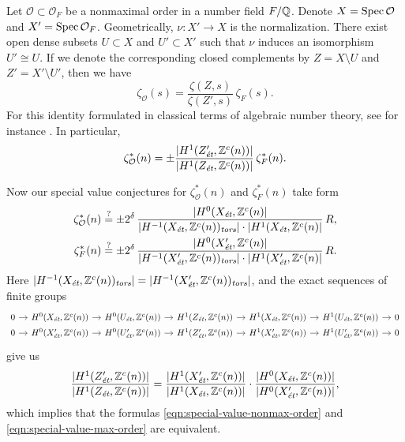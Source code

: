 \documentclass{article}
\numberwithin{equation}{section}
\begin{document}
\begin{example}
  Let $\mathcal{O} \subset \mathcal{O}_F$ be a nonmaximal order in a number
  field $F/\QQ$. Denote $X = \Spec \mathcal{O}$ and
  $X' = \Spec \mathcal{O}_F$. Geometrically, $\nu\colon X' \to X$ is the
  normalization. There exist open dense subsets $U \subset X$ and
  $U' \subset X'$ such that $\nu$ induces an isomorphism $U' \cong U$. If we
  denote the corresponding closed complements by $Z = X\setminus U$ and
  $Z' = X'\setminus U'$, then we have
  $$\zeta_\mathcal{O} (s) = \frac{\zeta (Z,s)}{\zeta (Z',s)}\,\zeta_F (s).$$
  For this identity formulated in classical terms of algebraic number theory,
  see for instance \cite{Jenner-1969}. In particular,
  \[ \zeta^*_\mathcal{O} (n) =
    \pm \frac{|H^1 (Z'_\et, \ZZ^c(n))|}{|H^1 (Z_\et, \ZZ^c(n))|}\,\zeta^*_F (n). \]

  Now our special value conjectures for $\zeta^*_\mathcal{O} (n)$ and
  $\zeta^*_F (n)$ take form
  \begin{align}
    \label{eqn:special-value-nonmax-order}
    \zeta^*_\mathcal{O} (n) & \stackrel{?}{=}
                              \pm 2^\delta\,\frac{|H^0 (X_\et, \ZZ^c (n)|}{|H^{-1} (X_\et, \ZZ^c (n))_\tors|\cdot |H^1 (X_\et, \ZZ^c (n)|}\,R, \\
    \label{eqn:special-value-max-order}
    \zeta^*_F (n) & \stackrel{?}{=}
                    \pm 2^\delta\,\frac{|H^0 (X'_\et, \ZZ^c (n)|}{|H^{-1} (X'_\et, \ZZ^c (n))_\tors|\cdot |H^1 (X'_\et, \ZZ^c (n)|}\,R.
  \end{align}
  Here
  $|H^{-1} (X_\et, \ZZ^c (n))_\tors| = |H^{-1} (X'_\et, \ZZ^c (n))_\tors|$, and
  the exact sequences of finite groups
  \[ \begin{tikzcd}[row sep=0pt, column sep=1em]
      0 \ar{r} & H^0 (X_\et, \ZZ^c (n)) \ar{r} & H^0 (U_\et, \ZZ^c (n)) \ar{r} & H^1 (Z_\et, \ZZ^c (n)) \ar{r} & H^1 (X_\et, \ZZ^c (n)) \ar{r} & H^1 (U_\et, \ZZ^c (n)) \ar{r} & 0 \\
      0 \ar{r} & H^0 (X'_\et, \ZZ^c (n)) \ar{r} & H^0 (U'_\et, \ZZ^c (n)) \ar{r} & H^1 (Z'_\et, \ZZ^c (n)) \ar{r} & H^1 (X'_\et, \ZZ^c (n)) \ar{r} & H^1 (U'_\et, \ZZ^c (n)) \ar{r} & 0
    \end{tikzcd} \]
  give us
  \[ \frac{|H^1 (Z'_\et, \ZZ^c (n))|}{|H^1 (Z_\et, \ZZ^c (n))|} =
    \frac{|H^1 (X'_\et, \ZZ^c (n))|}{|H^1 (X_\et, \ZZ^c (n))|}\cdot
    \frac{|H^0 (X_\et, \ZZ^c (n))|}{|H^0 (X'_\et, \ZZ^c (n))|}, \]
  which implies that the formulas \eqref{eqn:special-value-nonmax-order} and
  \eqref{eqn:special-value-max-order} are equivalent.
\end{example}
\end{document}
